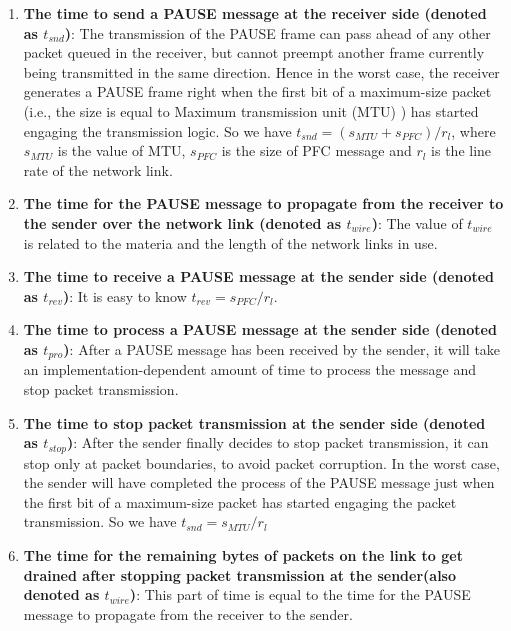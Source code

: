 \begin{enumerate}
	
\item\textbf{The time to send a PAUSE message at the receiver side (denoted as $t_{snd}$)}: The transmission of the PAUSE frame  can pass ahead of any other packet queued in the receiver, but cannot preempt another frame currently being transmitted in the same direction. Hence in the worst case, the receiver generates a PAUSE frame right when the first bit of a maximum-size packet (i.e., the size is equal to Maximum transmission unit (MTU) ) has started engaging the transmission logic. So we have  $t_{snd}=(s_{MTU}+s_{PFC})/r_{l}$, where $s_{MTU}$ is the value of MTU, $s_{PFC}$ is the size of PFC message and $r_{l}$ is the line rate of the network link.

\item\textbf{The time for the PAUSE message to propagate from the receiver to the sender over the network link (denoted as $t_{wire}$)}: The value of  $t_{wire}$ is related to the materia and the length of the network links in use.

\item\textbf{The time to receive a PAUSE message at the sender side (denoted as $t_{rev}$)}: It is easy to know $t_{rev}=s_{PFC}/r_{l}$.

\item\textbf{The time to process a PAUSE message at the sender side (denoted as $t_{pro}$)}:  After a PAUSE message has been received by the sender, it will take an implementation-dependent amount of time to process the message and stop packet transmission.

\item\textbf{The time to stop packet transmission at the sender side (denoted as $t_{stop}$)}: After the sender finally decides to stop packet transmission, it can stop only at packet boundaries, to avoid packet corruption.  In the worst case, the sender will have completed the process of the PAUSE message just when the first bit of a maximum-size packet has started engaging the packet transmission. So we have  $t_{snd}=s_{MTU}/r_{l}$

\item\textbf{The time for the remaining bytes of packets on the link to get drained after stopping packet transmission at the sender(also denoted as $t_{wire}$)}: This part of time is equal to the time for the PAUSE message to propagate from the receiver to the sender.
\end{enumerate}

